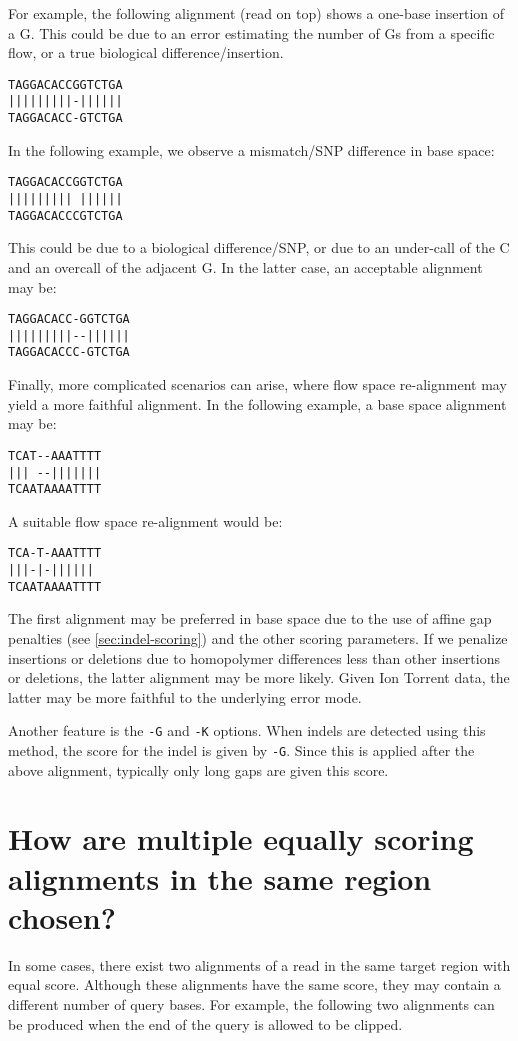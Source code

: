 \documentclass[a4paper,12pt]{book}
\newcommand{\TT}[1]{{\tt #1}} %
\begin{document}
For example, the following alignment (read on top) shows a one-base insertion of a G.
This could be due to an error estimating the number of Gs from a specific flow, or a true biological difference/insertion.
\begin{verbatim}
TAGGACACCGGTCTGA
|||||||||-||||||
TAGGACACC-GTCTGA
\end{verbatim}

In the following example, we observe a mismatch/SNP difference in base space:
\begin{verbatim}
TAGGACACCGGTCTGA
||||||||| ||||||
TAGGACACCCGTCTGA
\end{verbatim}
This could be due to a biological difference/SNP, or due to an under-call of the C and an overcall of the adjacent G.
In the latter case, an acceptable alignment may be:
\begin{verbatim}
TAGGACACC-GGTCTGA
|||||||||--||||||
TAGGACACCC-GTCTGA
\end{verbatim}

Finally, more complicated scenarios can arise, where flow space re-alignment may yield a more faithful alignment.
In the following example, a base space alignment may be:
\begin{verbatim}
TCAT--AAATTTT
||| --|||||||
TCAATAAAATTTT
\end{verbatim}
A suitable flow space re-alignment would be:
\begin{verbatim}
TCA-T-AAATTTT
|||-|-||||||
TCAATAAAATTTT
\end{verbatim}
The first alignment may be preferred in base space due to the use of affine gap penalties (see \autoref{sec:indel-scoring}) and the other scoring parameters.
If we penalize insertions or deletions due to homopolymer differences less than other insertions or deletions, the latter alignment may be more likely.
Given Ion Torrent data, the latter may be more faithful to the underlying error mode.

Another feature is the \TT{-G} and \TT{-K} options.
When indels are detected using this method, the score for the indel is given by \TT{-G}.
Since this is applied after the above alignment, typically only long gaps are given this score.

\section{How are multiple equally scoring alignments in the same region chosen?}

In some cases, there exist two alignments of a read in the same target region with equal score. 
Although these alignments have the same score, they may contain a different number of query bases.
For example, the following two alignments can be produced when the end of the query is allowed to be clipped. 
\end{document}

